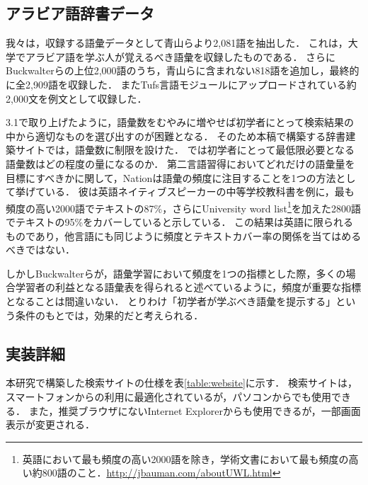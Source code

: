 \documentclass[technicalreport]{ieicej}
\begin{document}
\subsection{アラビア語辞書データ}
我々は，収録する語彙データとして青山ら\cite{aoyama2015}より2,081語を抽出した．
これは，大学でアラビア語を学ぶ人が覚えるべき語彙を収録したものである．
さらにBuckwalterら\cite{buckwalter2009}の上位2,000語のうち，青山ら\cite{aoyama2015}に含まれない818語を追加し，最終的に全2,909語を収録した．
またTufs言語モジュール\cite{kawaguchi2007}にアップロードされている約2,000文を例文として収録した．

3.1で取り上げたように，語彙数をむやみに増やせば初学者にとって検索結果の中から適切なものを選び出すのが困難となる．
そのため本稿で構築する辞書建築サイトでは，語彙数に制限を設けた．
では初学者にとって最低限必要となる語彙数はどの程度の量になるのか．
第二言語習得においてどれだけの語彙量を目標にすべきかに関して，Nation\cite{nation1990}は語彙の頻度に注目することを1つの方法として挙げている．
彼は英語ネイティブスピーカーの中等学校教科書を例に，最も頻度の高い2000語でテキストの87\%，さらにUniversity word list\footnote{英語において最も頻度の高い2000語を除き，学術文書において最も頻度の高い約800語のこと．\url{http://jbauman.com/aboutUWL.html}}を加えた2800語でテキストの95\%をカバーしていると示している．
この結果は英語に限られるものであり，他言語にも同じように頻度とテキストカバー率の関係を当てはめるべきではない．

しかしBuckwalterら\cite{buckwalter2009}が，語彙学習において頻度を1つの指標とした際，多くの場合学習者の利益となる語彙表を得られると述べているように，頻度が重要な指標となることは間違いない．
とりわけ「初学者が学ぶべき語彙を提示する」という条件のもとでは，効果的だと考えられる．

\subsection{実装詳細}
本研究で構築した検索サイトの仕様を表\ref{table:website}に示す．
検索サイトは，スマートフォンからの利用に最適化されているが，パソコンからでも使用できる．
また，推奨ブラウザにないInternet Explorerからも使用できるが，一部画面表示が変更される．
\end{document}
